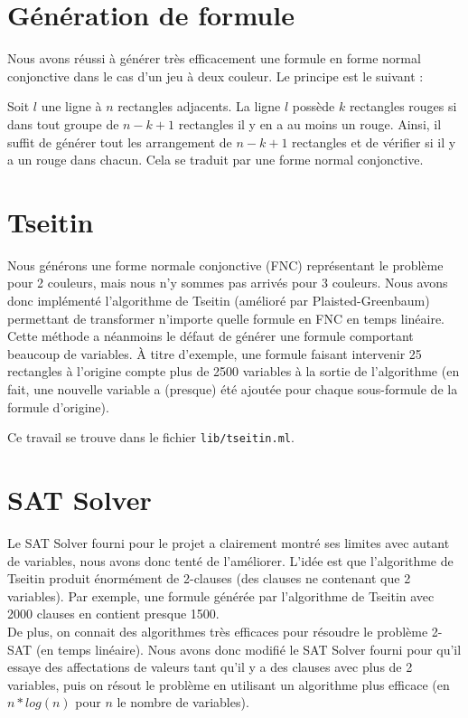 \documentclass[10pt,a4paper]{article}
\begin{document}
\section{Génération de formule}

Nous avons réussi à générer très efficacement une formule en forme normal conjonctive dans le cas d'un jeu à deux couleur. Le principe est le suivant :

Soit $l$ une ligne à $n$ rectangles adjacents. La ligne $l$ possède $k$ rectangles rouges si dans tout groupe de $n-k+1$ rectangles il y en a au moins un rouge. Ainsi, il suffit de générer tout les arrangement de $n-k+1$ rectangles et de vérifier si il y a un rouge dans chacun. Cela se traduit par une forme normal conjonctive.


\section{Tseitin}
Nous générons une forme normale conjonctive (FNC) représentant le problème pour 2 couleurs, mais nous n'y sommes pas arrivés pour 3 couleurs. Nous avons donc implémenté l'algorithme de Tseitin (amélioré par Plaisted-Greenbaum) permettant de transformer n'importe quelle formule en FNC en temps linéaire.
Cette méthode a néanmoins le défaut de générer une formule comportant beaucoup de variables. À titre d'exemple, une formule faisant intervenir 25 rectangles à l'origine compte plus de 2500 variables à la sortie de l'algorithme (en fait, une nouvelle variable a (presque) été ajoutée pour chaque sous-formule de la formule d'origine).

Ce travail se trouve dans le fichier \verb|lib/tseitin.ml|.

\section{SAT Solver}
Le SAT Solver fourni pour le projet a clairement montré ses limites avec autant de variables, nous avons donc tenté de l'améliorer. L'idée est que l'algorithme de Tseitin produit énormément de 2-clauses (des clauses ne contenant que 2 variables). Par exemple, une formule générée par l'algorithme de Tseitin avec 2000 clauses en contient presque 1500.\\
De plus, on connait des algorithmes très efficaces pour résoudre le problème 2-SAT (en temps linéaire). Nous avons donc modifié le SAT Solver fourni pour qu'il essaye des affectations de valeurs tant qu'il y a des clauses avec plus de 2 variables, puis on résout le problème en utilisant un algorithme plus efficace (en $n*log(n)$ pour $n$ le nombre de variables).
\end{document}
